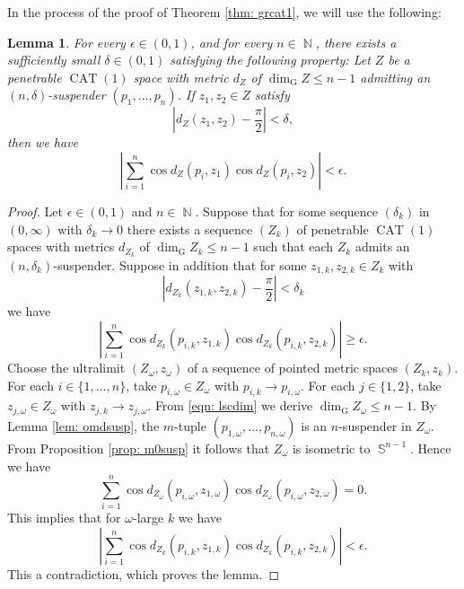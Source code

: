 \documentclass[a4paper,12pt]{amsart}
\newcommand{\CAT}{\operatorname{CAT}}
\newcommand{\N}{\operatorname{\mathbb{N}}}
\newcommand{\Sph}{\operatorname{\mathbb{S}}}
\numberwithin{equation}{section}
\theoremstyle{plain}
\newtheorem{lem}[thm]{Lemma}
\theoremstyle{definition}
\theoremstyle{remark}
\begin{document}
In the process of the proof of Theorem \ref{thm: grcat1},
we will use the following:

\begin{lem}\label{lem: aperp}
For every $\epsilon \in (0,1)$,
and for every $n \in \N$,
there exists a sufficiently small $\delta \in (0,1)$ 
satisfying the following property:
Let $Z$ be a penetrable $\CAT(1)$ space with metric $d_Z$
of $\dim_{\mathrm{G}}Z \le n-1$
admitting an $(n,\delta)$-suspender
$(p_1,\dots,p_n)$.
If $z_1, z_2 \in Z$ satisfy 
\[
\left\vert d_Z(z_1,z_2) - \frac{\pi}{2} \right\vert < \delta,
\]
then we have
\[
\left\vert
\sum_{i=1}^n \cos d_Z \left( p_i, z_1 \right)
\cos d_Z \left( p_i, z_2 \right)
\right\vert
< \epsilon.
\]
\end{lem}

\begin{proof}
Let $\epsilon \in (0,1)$ and $n \in \N$.
Suppose that
for some sequence $(\delta_k)$ in $(0,\infty)$ with $\delta_k \to 0$
there exists a sequence $(Z_k)$
of penetrable $\CAT(1)$ spaces with metrics $d_{Z_k}$
of $\dim_{\mathrm{G}}Z_k \le n-1$
such that
each $Z_k$ admits an $(n,\delta_k)$-suspender.
Suppose in addition that
for some $z_{1,k}, z_{2,k} \in Z_k$
with 
\[
\left\vert d_{Z_k} \left( z_{1,k} ,z_{2,k} \right) - \frac{\pi}{2} \right\vert 
< \delta_k
\]
we have
\[
\left\vert
\sum_{i=1}^n \cos d_{Z_k} \left( p_{i,k}, z_{1,k} \right)
\cos d_{Z_k} \left( p_{i,k}, z_{2,k} \right)
\right\vert
\ge \epsilon.
\]
Choose the ultralimit $(Z_{\omega},z_{\omega})$ 
of a sequence of pointed metric spaces $(Z_k,z_k)$.
For each $i \in \{ 1, \dots, n \}$,
take $p_{i,\omega} \in Z_{\omega}$ with $p_{i,k} \to p_{i,\omega}$.
For each $j \in \{ 1, 2 \}$,
take $z_{j,\omega} \in Z_{\omega}$ with $z_{j,k} \to z_{j,\omega}$.
From \eqref{eqn: lscdim}
we derive $\dim_{\mathrm{G}}Z_{\omega} \le n-1$.
By Lemma \ref{lem: omdsusp}, 
the $m$-tuple 
$\left( p_{1,\omega}, \dots, p_{n,\omega} \right)$
is an $n$-suspender in $Z_{\omega}$.
From Proposition \ref{prop: m0susp}
it follows that $Z_{\omega}$ is isometric to $\Sph^{n-1}$.
Hence we have
\[
\sum_{i=1}^n \cos d_{Z_{\omega}} \left( p_{i,\omega}, z_{1,\omega} \right)
\cos d_{Z_{\omega}} \left( p_{i,\omega}, z_{2,\omega} \right) = 0.
\]
This implies that for $\omega$-large $k$ we have
\[
\left\vert
\sum_{i=1}^n \cos d_{Z_k} \left( p_{i,k}, z_{1,k} \right)
\cos d_{Z_k} \left( p_{i,k}, z_{2,k} \right)
\right\vert
< \epsilon.
\]
This a contradiction,
which proves the lemma.
\end{proof}

\end{document}
